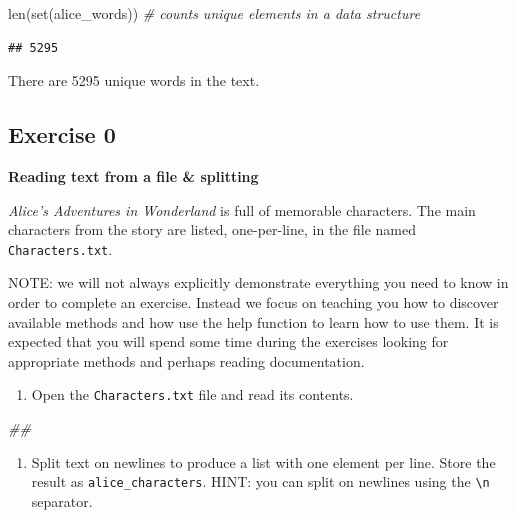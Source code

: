 \documentclass[
]{book}
\newenvironment{Shaded}{\begin{snugshade}}{\end{snugshade}}
\newcommand{\BuiltInTok}[1]{#1}
\newcommand{\CommentTok}[1]{\textcolor[rgb]{0.56,0.35,0.01}{\textit{#1}}}
\newcommand{\NormalTok}[1]{#1}
\providecommand{\tightlist}{%
  \setlength{\itemsep}{0pt}\setlength{\parskip}{0pt}}
\begin{document}
\begin{Shaded}
\begin{Highlighting}[]
\BuiltInTok{len}\NormalTok{(}\BuiltInTok{set}\NormalTok{(alice\_words)) }\CommentTok{\# counts unique elements in a data structure}
\end{Highlighting}
\end{Shaded}

\begin{verbatim}
## 5295
\end{verbatim}

There are 5295 unique words in the text.

\hypertarget{exercise-0-3}{%
\subsection{Exercise 0}\label{exercise-0-3}}

\textbf{Reading text from a file \& splitting}

\emph{Alice's Adventures in Wonderland} is full of memorable characters. The main characters from the story are listed, one-per-line, in the file named \texttt{Characters.txt}.

NOTE: we will not always explicitly demonstrate everything you need to know in order to complete an exercise. Instead we focus on teaching you how to discover available methods and how use the help function to learn how to use them. It is expected that you will spend some time during the exercises looking for appropriate methods and perhaps reading documentation.

\begin{enumerate}
\def\labelenumi{\arabic{enumi}.}
\tightlist
\item
  Open the \texttt{Characters.txt} file and read its contents.
\end{enumerate}

\begin{Shaded}
\begin{Highlighting}[]
\CommentTok{\#\#}
\end{Highlighting}
\end{Shaded}

\begin{enumerate}
\def\labelenumi{\arabic{enumi}.}
\setcounter{enumi}{1}
\tightlist
\item
  Split text on newlines to produce a list with one element per line. Store the result as \texttt{alice\_characters}. HINT: you can split on newlines using the \texttt{\textbackslash{}n} separator.
\end{enumerate}
\end{document}
